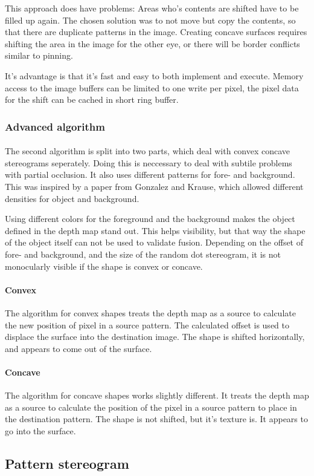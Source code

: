 This approach does have problems: Areas who's contents are shifted have to be filled up again. The chosen solution was to not move but copy the contents, so that there are duplicate patterns in the image. Creating concave surfaces requires shifting the area in the image for the other eye, or there will be border conflicts similar to pinning.

It's advantage is that it's fast and easy to both implement and execute. Memory access to the image buffers can be limited to one write per pixel, the pixel data for the shift can be cached in short ring buffer.

\subsubsection{Advanced algorithm}
\paragraph{}
The second algorithm is split into two parts, which deal with convex concave stereograms seperately. Doing this is neccessary to deal with subtile problems with partial occlusion. It also uses different patterns for fore- and background. This was inspired by a paper from Gonzalez and Krause\cite{GenRDS}, which allowed different densities for object and background.

Using different colors for the foreground and the background makes the object defined in the depth map stand out. This helps visibility, but that way the shape of the object itself can not be used to validate fusion. Depending on the offset of fore- and background, and the size of the random dot stereogram, it is not monocularly visible if the shape is convex or concave.


\paragraph{Convex}
The algorithm for convex shapes treats the depth map as a source to calculate the new position of pixel in a source pattern. The calculated offset is used to displace the surface into the destination image. The shape is shifted horizontally, and appears to come out of the surface.

\paragraph{Concave}
The algorithm for concave shapes works slightly different. It treats the depth map as a source to calculate the position of the pixel in a source pattern to place in the destination pattern. The shape is not shifted, but it's texture is. It appears to go into the surface.

\subsection{Pattern stereogram}
\paragraph{}

